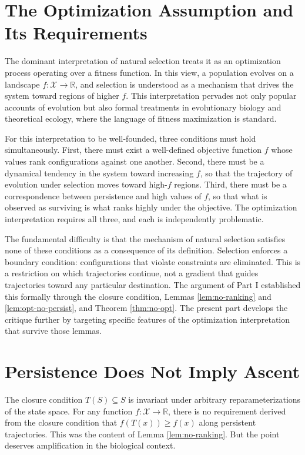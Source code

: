 \documentclass[12pt, a4paper, oneside]{article}
\theoremstyle{plain}
\theoremstyle{definition}
\theoremstyle{remark}
\newcommand{\X}{\mathcal{X}}
\newcommand{\T}{T}
\begin{document}
\setcounter{section}{31}

\section{The Optimization Assumption and Its Requirements}

The dominant interpretation of natural selection treats it as an optimization process operating over a fitness function. In this view, a population evolves on a landscape $f : \X \to \mathbb{R}$, and selection is understood as a mechanism that drives the system toward regions of higher $f$. This interpretation pervades not only popular accounts of evolution but also formal treatments in evolutionary biology and theoretical ecology, where the language of fitness maximization is standard.

For this interpretation to be well-founded, three conditions must hold simultaneously. First, there must exist a well-defined objective function $f$ whose values rank configurations against one another. Second, there must be a dynamical tendency in the system toward increasing $f$, so that the trajectory of evolution under selection moves toward high-$f$ regions. Third, there must be a correspondence between persistence and high values of $f$, so that what is observed as surviving is what ranks highly under the objective. The optimization interpretation requires all three, and each is independently problematic.

The fundamental difficulty is that the mechanism of natural selection satisfies none of these conditions as a consequence of its definition. Selection enforces a boundary condition: configurations that violate constraints are eliminated. This is a restriction on which trajectories continue, not a gradient that guides trajectories toward any particular destination. The argument of Part I established this formally through the closure condition, Lemmas \ref{lem:no-ranking} and \ref{lem:opt-no-persist}, and Theorem \ref{thm:no-opt}. The present part develops the critique further by targeting specific features of the optimization interpretation that survive those lemmas.

\section{Persistence Does Not Imply Ascent}

The closure condition $\T(S) \subseteq S$ is invariant under arbitrary reparameterizations of the state space. For any function $f : \X \to \mathbb{R}$, there is no requirement derived from the closure condition that $f(\T(x)) \geq f(x)$ along persistent trajectories. This was the content of Lemma \ref{lem:no-ranking}. But the point deserves amplification in the biological context.
\end{document}
